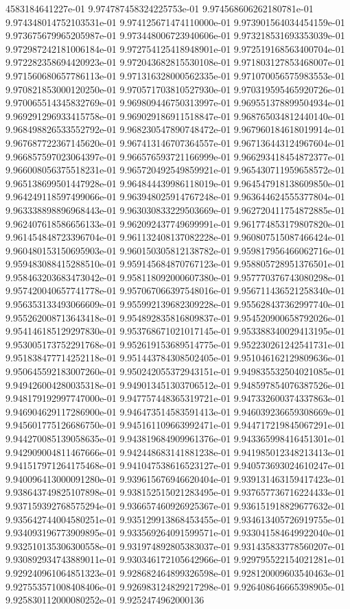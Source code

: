 4583184641227e-01	9.974787458324225753e-01	9.974568606262180781e-01	9.974348014752103531e-01	9.974125671474110000e-01	9.973901564034454159e-01	9.973675679965205987e-01	9.973448006723940606e-01	9.973218531693353039e-01	9.972987242181006184e-01	9.972754125418948901e-01	9.972519168563400704e-01	9.972282358694420923e-01	9.972043682815530108e-01	9.971803127853468007e-01	9.971560680657786113e-01	9.971316328000562335e-01	9.971070056575983553e-01	9.970821853000120250e-01	9.970571703810527930e-01	9.970319595465920726e-01	9.970065514345832769e-01	9.969809446750313997e-01	9.969551378899504934e-01	9.969291296933415758e-01	9.969029186911518847e-01	9.968765034812440140e-01	9.968498826533552792e-01	9.968230547890748472e-01	9.967960184618019914e-01	9.967687722367145620e-01	9.967413146707364557e-01	9.967136443124967604e-01	9.966857597023064397e-01	9.966576593721166999e-01	9.966293418454872377e-01	9.966008056375518231e-01	9.965720492549859921e-01	9.965430711959658572e-01	9.965138699501447928e-01	9.964844439986118019e-01	9.964547918138609850e-01	9.964249118597499066e-01	9.963948025914767248e-01	9.963644624555377804e-01	9.963338898896968443e-01	9.963030833229503669e-01	9.962720411754872885e-01	9.962407618586656133e-01	9.962092437749699991e-01	9.961774853179807820e-01	9.961454848723396704e-01	9.961132408137082228e-01	9.960807515087466424e-01	9.960480153150695903e-01	9.960150305812138782e-01	9.959817956466062716e-01	9.959483088415288510e-01	9.959145684870767123e-01	9.958805728951376501e-01	9.958463203683473042e-01	9.958118092000607380e-01	9.957770376743080298e-01	9.957420040657741778e-01	9.957067066397548016e-01	9.956711436521258340e-01	9.956353133493066609e-01	9.955992139682309228e-01	9.955628437362997740e-01	9.955262008713643418e-01	9.954892835816809837e-01	9.954520900658792026e-01	9.954146185129297830e-01	9.953768671021017145e-01	9.953388340029413195e-01	9.953005173752291768e-01	9.952619153689514775e-01	9.952230261242541731e-01	9.951838477714252118e-01	9.951443784308502405e-01	9.951046162129809636e-01	9.950645592183007260e-01	9.950242055372943151e-01	9.949835532504021085e-01	9.949426004280035318e-01	9.949013451303706512e-01	9.948597854076387526e-01	9.948179192997747000e-01	9.947757448365319721e-01	9.947332600374337863e-01	9.946904629117286900e-01	9.946473514583591413e-01	9.946039236659308669e-01	9.945601775126686750e-01	9.945161109663992471e-01	9.944717219845067291e-01	9.944270085139058635e-01	9.943819684909961376e-01	9.943365998416451301e-01	9.942909004811467666e-01	9.942448683141881238e-01	9.941985012348213413e-01	9.941517971264175468e-01	9.941047538616523127e-01	9.940573693024610247e-01	9.940096413000091280e-01	9.939615676946620404e-01	9.939131463159417423e-01	9.938643749825107898e-01	9.938152515021283495e-01	9.937657736716224433e-01	9.937159392768575294e-01	9.936657460926925367e-01	9.936151918829677632e-01	9.935642744004580251e-01	9.935129913868453455e-01	9.934613405726919755e-01	9.934093196773909895e-01	9.933569264091599571e-01	9.933041584649922040e-01	9.932510135306300558e-01	9.931974892805383037e-01	9.931435833778560207e-01	9.930892934743889011e-01	9.930346172105642966e-01	9.929795522154021281e-01	9.929240961064851323e-01	9.928682464899326598e-01	9.928120009603540463e-01	9.927553571008408406e-01	9.926983124829217298e-01	9.926408646665398905e-01	9.925830112000080252e-01	9.9252474962000136